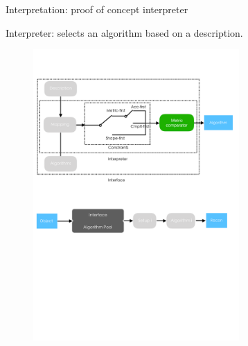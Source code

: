 \documentclass[10pt]{beamer}
\begin{document}



\begin{frame}{Interpretation: proof of concept interpreter}

Interpreter: selects an algorithm based on a description.

\begin{figure}[!htbp]
\centering
\includegraphics[width=0.7\textwidth]{interp/interpreter.pdf}
\end{figure}

\end{frame}
\end{document}
